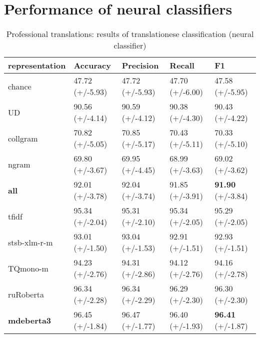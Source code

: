 \chapter{\label{appx:neural_res}Performance of neural classifiers}

\begin{table}[H]
	\centering
	\begin{tabular}{l|llll}
		\toprule
		representation & Accuracy        & Precision       & Recall          & F1              \\
		\midrule
		chance          & 47.72 (+/-5.93) & 47.72 (+/-5.93) & 47.70 (+/-6.00) & 47.58 (+/-5.95) \\
		\midrule
		UD              & 90.56 (+/-4.14) & 90.59 (+/-4.12) & 90.38 (+/-4.30) & 90.43 (+/-4.22) \\
		collgram        & 70.82 (+/-5.05) & 70.85 (+/-5.17) & 70.43 (+/-5.11) & 70.33 (+/-5.10) \\
		ngram           & 69.80 (+/-3.67) & 69.95 (+/-4.45) & 68.99 (+/-3.63) & 69.02 (+/-3.62) \\
		\textbf{all}             & 92.01 (+/-3.78) & 92.04 (+/-3.74) & 91.85 (+/-3.91) & \textbf{91.90} (+/-3.84) \\
		\midrule
		tfidf           & 95.34 (+/-2.04) & 95.31 (+/-2.10) & 95.34 (+/-2.05) & 95.29 (+/-2.05) \\
		\midrule
		stsb-xlm-r-m         & 93.01 (+/-1.50) & 93.04 (+/-1.53) & 92.91 (+/-1.51) & 92.93 (+/-1.51) \\
		TQmono-m       & 94.23 (+/-2.76) & 94.31 (+/-2.86) & 94.12 (+/-2.76) & 94.16 (+/-2.78) \\
		ruRoberta & 96.34 (+/-2.28) & 96.34 (+/-2.29) & 96.29 (+/-2.30) & 96.30 (+/-2.30) \\
		\textbf{mdeberta3}  & 96.45 (+/-1.84) & 96.47 (+/-1.77) & 96.40 (+/-1.93) & \boxit{0.4in} \textbf{96.41} (+/-1.87) \\
	\bottomrule
	\end{tabular}
	\caption{\label{tab:pro-ref_neu}Professional translations: results of translationese classification (neural classifier)}
\end{table}


